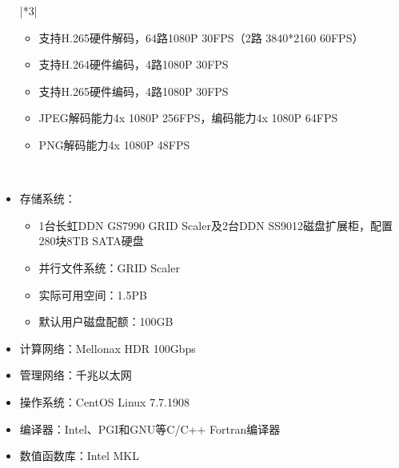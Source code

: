 \documentclass[a4paper,12pt,english]{sphinxmanual}
\begin{document}
\begin{itemize}
\begin{savenotes}
\begin{tabular}[t]{|*{3}{|}}
\begin{itemize}
\item {} 
\sphinxAtStartPar
支持H.265硬件解码，64路1080P
30FPS（2路 3840*2160 60FPS）

\item {} 
\sphinxAtStartPar
支持H.264硬件编码，4路1080P
30FPS

\item {} 
\sphinxAtStartPar
支持H.265硬件编码，4路1080P
30FPS

\item {} 
\sphinxAtStartPar
JPEG解码能力4x 1080P
256FPS，编码能力4x 1080P 64FPS

\item {} 
\sphinxAtStartPar
PNG解码能力4x 1080P 48FPS

\end{itemize}
\\
\sphinxbottomrule
\end{tabular}
\sphinxtableafterendhook\par
\sphinxattableend\end{savenotes}

\item {} 
\sphinxAtStartPar
存储系统：
\begin{itemize}
\item {} 
\sphinxAtStartPar
1台长虹DDN GS7990 GRID Scaler及2台DDN SS9012磁盘扩展柜，配置280块8TB SATA硬盘

\item {} 
\sphinxAtStartPar
并行文件系统：GRID Scaler

\item {} 
\sphinxAtStartPar
实际可用空间：1.5PB

\item {} 
\sphinxAtStartPar
默认用户磁盘配额：100GB

\end{itemize}

\item {} 
\sphinxAtStartPar
计算网络：Mellonax HDR 100Gbps

\item {} 
\sphinxAtStartPar
管理网络：千兆以太网

\item {} 
\sphinxAtStartPar
操作系统：CentOS Linux 7.7.1908

\item {} 
\sphinxAtStartPar
编译器：Intel、PGI和GNU等C/C++ Fortran编译器

\item {} 
\sphinxAtStartPar
数值函数库：Intel MKL


\end{itemize}
\end{document}
